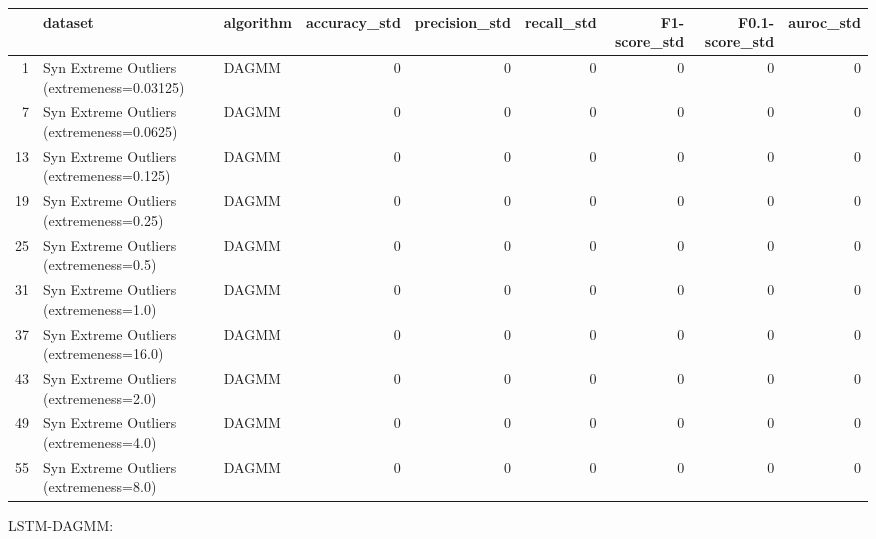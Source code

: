 \begin{tabular}{rllrrrrrr}
\hline
    & dataset                                    & algorithm   &   accuracy\_std &   precision\_std &   recall\_std &   F1-score\_std &   F0.1-score\_std &   auroc\_std \\
\hline
  1 & Syn Extreme Outliers (extremeness=0.03125) & DAGMM       &              0 &               0 &            0 &              0 &                0 &           0 \\
  7 & Syn Extreme Outliers (extremeness=0.0625)  & DAGMM       &              0 &               0 &            0 &              0 &                0 &           0 \\
 13 & Syn Extreme Outliers (extremeness=0.125)   & DAGMM       &              0 &               0 &            0 &              0 &                0 &           0 \\
 19 & Syn Extreme Outliers (extremeness=0.25)    & DAGMM       &              0 &               0 &            0 &              0 &                0 &           0 \\
 25 & Syn Extreme Outliers (extremeness=0.5)     & DAGMM       &              0 &               0 &            0 &              0 &                0 &           0 \\
 31 & Syn Extreme Outliers (extremeness=1.0)     & DAGMM       &              0 &               0 &            0 &              0 &                0 &           0 \\
 37 & Syn Extreme Outliers (extremeness=16.0)    & DAGMM       &              0 &               0 &            0 &              0 &                0 &           0 \\
 43 & Syn Extreme Outliers (extremeness=2.0)     & DAGMM       &              0 &               0 &            0 &              0 &                0 &           0 \\
 49 & Syn Extreme Outliers (extremeness=4.0)     & DAGMM       &              0 &               0 &            0 &              0 &                0 &           0 \\
 55 & Syn Extreme Outliers (extremeness=8.0)     & DAGMM       &              0 &               0 &            0 &              0 &                0 &           0 \\
\hline
\end{tabular}

LSTM-DAGMM:

